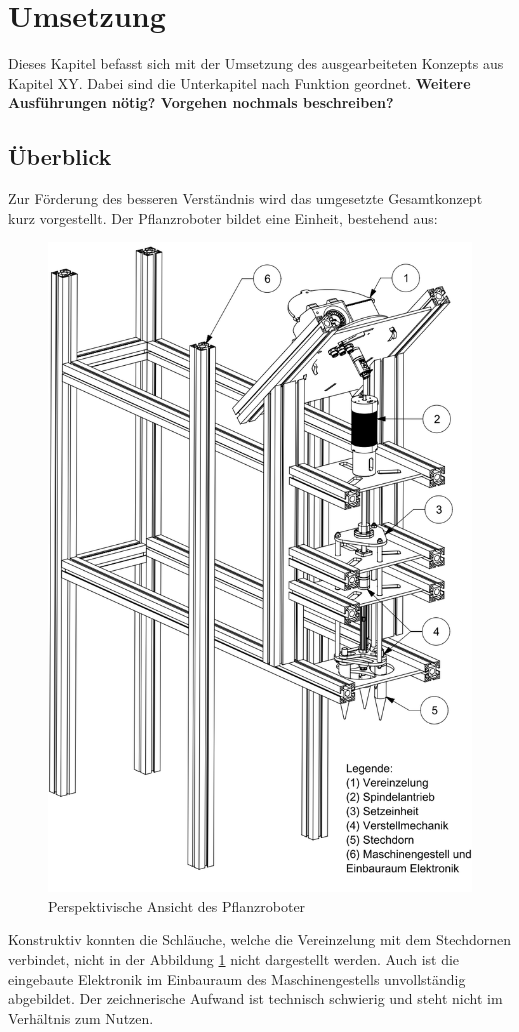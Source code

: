 \newpage
\section{Umsetzung}
Dieses Kapitel befasst sich mit der Umsetzung des ausgearbeiteten Konzepts aus Kapitel XY. Dabei sind die Unterkapitel nach Funktion geordnet. \textbf{Weitere Ausführungen nötig? Vorgehen nochmals beschreiben?}
\newpage
\subsection{Überblick}
Zur Förderung des besseren Verständnis wird das umgesetzte Gesamtkonzept kurz vorgestellt.  Der Pflanzroboter bildet eine Einheit, bestehend aus:
	\begin{figure}[H]
	\includegraphics[scale=0.45]{Illustrationen/6-Umsetzung/uberblick.png}
	\caption{Perspektivische Ansicht des Pflanzroboter}
	\label{fig:uberblick}
	\end{figure}
Konstruktiv konnten die Schläuche, welche die Vereinzelung mit dem Stechdornen verbindet, nicht in der Abbildung \ref{fig:uberblick} nicht dargestellt werden. Auch ist die eingebaute Elektronik im Einbauraum des Maschinengestells unvollständig abgebildet. Der zeichnerische Aufwand ist technisch schwierig und steht nicht im Verhältnis zum Nutzen. 
